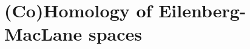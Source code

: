 \chapter{(Co)Homology of Eilenberg-MacLane spaces}\label{chapter:2}


\newpage

\newpage

\newpage

\newpage
